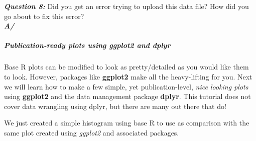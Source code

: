\documentclass[]{article}
\newenvironment{Shaded}{\begin{snugshade}}{\end{snugshade}}
\newcommand{\CommentTok}[1]{\textcolor[rgb]{0.56,0.35,0.01}{\textit{#1}}}
\newcommand{\DataTypeTok}[1]{\textcolor[rgb]{0.13,0.29,0.53}{#1}}
\newcommand{\DecValTok}[1]{\textcolor[rgb]{0.00,0.00,0.81}{#1}}
\newcommand{\KeywordTok}[1]{\textcolor[rgb]{0.13,0.29,0.53}{\textbf{#1}}}
\newcommand{\NormalTok}[1]{#1}
\newcommand{\OperatorTok}[1]{\textcolor[rgb]{0.81,0.36,0.00}{\textbf{#1}}}
\newcommand{\StringTok}[1]{\textcolor[rgb]{0.31,0.60,0.02}{#1}}
\let\oldsubparagraph\subparagraph
\renewcommand{\subparagraph}[1]{\oldsubparagraph{#1}\mbox{}}
\begin{document}
\textbf{\emph{Question 8:}} Did you get an error trying to upload this
data file? How did you go about to fix this error?\\
\textbf{\emph{A/}}

\begin{Shaded}
\end{Shaded}

\hypertarget{publication-ready-plots-using-ggplot2-and-dplyr}{%
\subparagraph{Publication-ready plots using ggplot2 and
dplyr}\label{publication-ready-plots-using-ggplot2-and-dplyr}}

Base R plots can be modified to look as pretty/detailed as you would
like them to look. However, packages like \textbf{ggplot2} make all the
heavy-lifting for you. Next we will learn how to make a few simple, yet
publication-level, \emph{nice looking plots} using \textbf{ggplot2} and
the data management package \textbf{dplyr}. This tutorial does not cover
data wrangling using dplyr, but there are many out there that do!

We just created a simple histogram using base R to use as comparison
with the same plot created using \emph{ggplot2} and associated packages.
\end{document}
